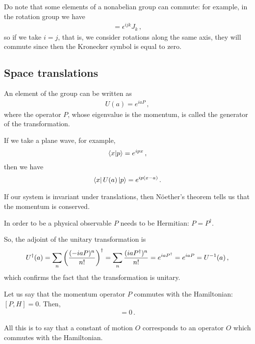 \documentclass[main.tex]{subfiles}
\begin{document}

Do note that some elements of a nonabelian group can commute: for example, in the rotation group we have 
%
\begin{align}
[J^{i}, J^{j}] = \epsilon^{ijk} J_{k}
\,,
\end{align}
%
so if we take \(i = j\), that is, we consider rotations along the same axis, they will commute since then the Kronecker symbol is equal to zero. 

\subsection{Space translations}

An element of the group can be written as 
%
\begin{align}
U(a) = e^{i a P }
\,,
\end{align}
%
where the operator \(P\), whose eigenvalue is the momentum, is called the generator of the transformation. 

If we take a plane wave, for example,
%
\begin{align}
\braket{x}{p} = e^{i p x}
\,,
\end{align}
%
then we have 
%
\begin{align}
\bra{x} U(a) \ket{p} = e^{i p (x-a)}
\,.
\end{align}

If our system is invariant under translations, then Nöether's theorem tells us that the momentum is conserved. 

In order to be a physical observable \(P\) needs to be Hermitian: \(P = P ^\dag\). 

So, the adjoint of the unitary transformation is 
%
\begin{align}
U ^\dag (a) =
\sum _{n} \qty(\frac{(-iaP)^{n}}{n!}) ^\dag
= \sum _{n} \frac{(iaP ^\dag)^{n}}{n!}
=
e^{i a P ^\dag} = e^{iaP} = U^{-1}(a)
\,,
\end{align}
%
which confirms the fact that the transformation is unitary. 

Let us say that the momentum operator \(P\) commutes with the Hamiltonian: \([P,H] = 0\). Then, 
%
\begin{align}
[U(a), H] = 0 
\,.
\end{align}

All this is to say that a constant of motion \(O\) corresponds to an operator \(O\) which commutes with the Hamiltonian. 
\end{document}
